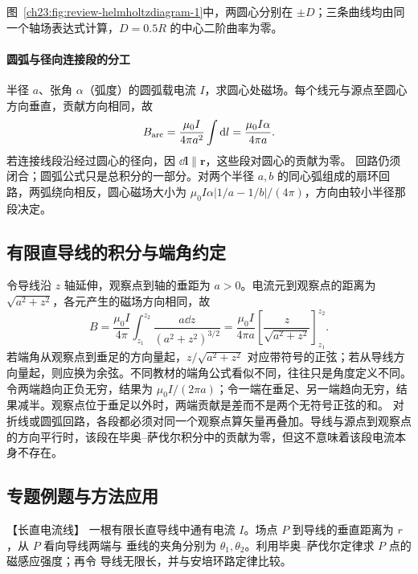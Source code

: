 {图~\ref{ch23:fig:review-helmholtzdiagram-1}中，两圆心分别在 $\pm D$；三条曲线均由同一个轴场表达式计算，$D=0.5R$ 的中心二阶曲率为零。
\par\noindent\begin{minipage}{\linewidth}
\helmholtzDiagram
{}
\end{minipage}\par\medskip

\motorHelmholtzContext


\paragraph{圆弧与径向连接段的分工}
半径 $a$、张角 $\alpha$（弧度）的圆弧载电流 $I$，求圆心处磁场。每个线元与源点至圆心方向垂直，贡献方向相同，故
\[
 B_{\rm arc}=\frac{\mu_0I}{4\pi a^2}\int\mathop{}\!\mathrm d l
 =\frac{\mu_0I\alpha}{4\pi a}.
\]
若连接线段沿经过圆心的径向，因 $\dd\boldsymbol l\parallel\boldsymbol r$，这些段对圆心的贡献为零。
回路仍须闭合；圆弧公式只是总积分的一部分。对两个半径 $a,b$ 的同心弧组成的扇环回路，两弧绕向相反，圆心磁场大小为
$\mu_0I\alpha|1/a-1/b|/(4\pi)$，方向由较小半径那段决定。


\subsection{有限直导线的积分与端角约定}
令导线沿 $z$ 轴延伸，观察点到轴的垂距为 $a>0$。电流元到观察点的距离为 $\sqrt{a^2+z^2}$，各元产生的磁场方向相同，故
\[
 B=\frac{\mu_0I}{4\pi}\int_{z_1}^{z_2}\frac{a\dd z}{(a^2+z^2)^{3/2}}
 =\frac{\mu_0I}{4\pi a}\left[\frac z{\sqrt{a^2+z^2}}\right]_{z_1}^{z_2}.
\]
若端角从观察点到垂足的方向量起，$z/\sqrt{a^2+z^2}$ 对应带符号的正弦；若从导线方向量起，则应换为余弦。不同教材的端角公式看似不同，往往只是角度定义不同。
令两端趋向正负无穷，结果为 $\mu_0I/(2\pi a)$；令一端在垂足、另一端趋向无穷，结果减半。观察点位于垂足以外时，两端贡献是差而不是两个无符号正弦的和。
对折线或圆弧回路，各段都必须对同一个观察点算矢量再叠加。导线与源点到观察点的方向平行时，该段在毕奥--萨伐尔积分中的贡献为零，但这不意味着该段电流本身不存在。


\subsection{专题例题与方法应用}

\begin{origexamplebox}{【长直电流线】}\label{ch23:ex:s39-8-1}
一根有限长直导线中通有电流 $I$。场点 $P$ 到导线的垂直距离为 $r$，从 $P$ 看向导线两端与
垂线的夹角分别为 $\theta_1,\theta_2$。利用毕奥--萨伐尔定律求 $P$ 点的磁感应强度；再令
导线无限长，并与安培环路定律比较。


\end{origexamplebox}}
